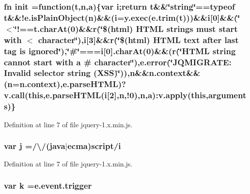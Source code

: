 \subsubsection[{\texorpdfstring{init}{init}}]{ {\bf fn} init =function({\bf t},{\bf n},{\bf a})\{var {\bf i};return {\bf t}\&\&\char`\"{}string\char`\"{}==typeof {\bf t}\&\&!e.\+is\+Plain\+Object({\bf n})\&\&({\bf i}=y.\+exec({\bf e.\+trim}({\bf t})))\&\&{\bf i}\mbox{[}0\mbox{]}\&\&(\char`\"{}$<$\char`\"{}!==t.\+char\+At(0)\&\&r(\char`\"{}\$(html) H\+T\+ML strings must {\bf start} with \textquotesingle{}$<$\textquotesingle{} character\char`\"{}),i\mbox{[}3\mbox{]}\&\&r(\char`\"{}\$(html) H\+T\+ML text after last {\bf tag} is ignored\char`\"{}),\char`\"{}\#\char`\"{}===i\mbox{[}0\mbox{]}.char\+At(0)\&\&(r(\char`\"{}H\+T\+ML string cannot {\bf start} with {\bf a} \textquotesingle{}\#\textquotesingle{} character\char`\"{}),e.\+error(\char`\"{}J\+Q\+M\+I\+G\+R\+A\+T\+E\+: Invalid selector string (X\+SS)\char`\"{})),n\&\&n.\+context\&\&({\bf n}=n.\+context),e.\+parse\+H\+T\+ML)?v.\+call({\bf this},e.\+parse\+H\+T\+ML({\bf i}\mbox{[}2\mbox{]},{\bf n},!0),{\bf n},{\bf a})\+:v.\+apply({\bf this},arguments)\}}\hypertarget{jquery-1_8x_8min_8js_afa61e9d398b270d554318847ceeaedc7}{}\label{jquery-1_8x_8min_8js_afa61e9d398b270d554318847ceeaedc7}


Definition at line 7 of file jquery-\/1.\+x.\+min.\+js.

\subsubsection[{\texorpdfstring{j}{j}}]{\setlength{\rightskip}{0pt plus 5cm}var j =/\textbackslash{}/(java$\vert$ecma)script/{\bf i}}\hypertarget{jquery-1_8x_8min_8js_aab858032a95af802114b255fac6f45f2}{}\label{jquery-1_8x_8min_8js_aab858032a95af802114b255fac6f45f2}


Definition at line 7 of file jquery-\/1.\+x.\+min.\+js.

\subsubsection[{\texorpdfstring{k}{k}}]{\setlength{\rightskip}{0pt plus 5cm}var k ={\bf e.\+event.\+trigger}}\hypertarget{jquery-1_8x_8min_8js_ab26645c014aa005ecedef329ecf58c99}{}\label{jquery-1_8x_8min_8js_ab26645c014aa005ecedef329ecf58c99}


